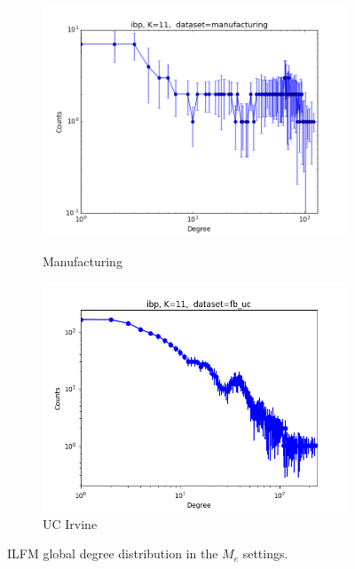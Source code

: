 \begin{figure}[h]
\begin{subfigure}[b]{0.300\textwidth}
            \centering
            \includegraphics[width=\textwidth]{img/expe/5_ibp/figure_1}
            \label{fig:mean and std of net14}
            \caption {{\small Manufacturing}}    
        \end{subfigure}
        \begin{subfigure}[b]{0.300\textwidth}
            \centering
            \includegraphics[width=\textwidth]{img/expe/6_ibp/figure_1}
            \caption {{\small UC Irvine}}    
            \label{fig:mean and std of net14}
        \end{subfigure}
        \caption{ILFM global degree distribution in the $M_e$ settings. } 
\end{figure}
